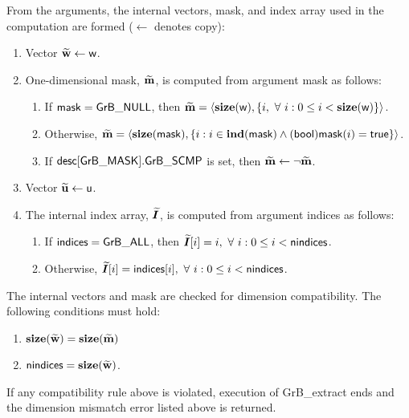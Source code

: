 From the arguments, the internal vectors, mask, and index array used in 
the computation are formed ($\leftarrow$ denotes copy):
\begin{enumerate}
	\item Vector ${\bf \widetilde{w}} \leftarrow {\sf w}$.

	\item One-dimensional mask, ${\bf \widetilde{m}}$, is computed from 
    argument {\sf mask} as follows:
	\begin{enumerate}
		\item	If ${\sf mask} = {\sf GrB\_NULL}$, then ${\bf \widetilde{m}} = 
        \langle \bold{size}({\sf w}), \{i, \ \forall \ i : 0 \leq i < 
        \bold{size}({\sf w}) \} \rangle$.

		\item	Otherwise, ${\bf \widetilde{m}} = 
        \langle \bold{size}({\sf mask}), \{i : i \in \bold{ind}({\sf mask}) \wedge
        ({\sf bool}){\sf mask}(i) = {\sf true} \} \rangle$.

		\item	If ${\sf desc[GrB\_MASK].GrB\_SCMP}$ is set, then 
        ${\bf \widetilde{m}} \leftarrow \neg {\bf \widetilde{m}}$.
	\end{enumerate}

	\item Vector ${\bf \widetilde{u}} \leftarrow {\sf u}$.
    
    \item The internal index array, $\bm{\widetilde{I}}$, is computed from 
    argument {\sf indices} as follows:
	\begin{enumerate}
		\item	If ${\sf indices} = {\sf GrB\_ALL}$, then 
        $\bm{\widetilde{I}}[i] = i, \ \forall \ i : 0 \leq i < {\sf nindices}$.

		\item	Otherwise, $\bm{\widetilde{I}}[i] = {\sf indices}[i], 
        \ \forall \ i : 0 \leq i < {\sf nindices}$.
    \end{enumerate}
\end{enumerate}

The internal vectors and mask are checked for dimension compatibility. 
The following conditions must hold:
\begin{enumerate}
	\item $\bold{size}({\bf \widetilde{w}}) = \bold{size}({\bf \widetilde{m}})$
    \item ${\sf nindices} = \bold{size}({\bf \widetilde{w}})$.
\end{enumerate}
If any compatibility rule above is violated, execution of {\sf GrB\_extract} ends and 
the dimension mismatch error listed above is returned.

